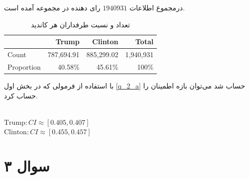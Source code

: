 \documentclass[12pt]{article}
\begin{document}
 درمجموع اطلاعات 
 $1940931$
 رای دهنده در مجموعه آمده است.
 



 \begin{table}[ht]
 	\centering
 	\caption{تعداد و نسبت طرفداران هر کاندید}
 	 \begin{latin}
 	\begin{tabular}{|l|r|r|r|}
 		\hline
 		& Trump & Clinton & Total \\
 		\hline
 		Count & 787,694.91 & 885,299.02 & 1,940,931 \\
 		Proportion & 40.58\% & 45.61\% & 100\% \\
 		\hline
 	\end{tabular}
 	  \end{latin}
 \end{table}

 با استفاده از فرمولی که در بخش اول  \ref{q_2_a} حساب شد می‌توان بازه اطمینان را حساب کرد.
 
\begin{latin}
	~\\
 $
\text{Trump}: CI \approx [0.405, 0.407]
 $
 \\
 $
 \text{Clinton}: CI \approx [0.455, 0.457]
 $
\end{latin}
\section{سوال ۳}
\end{document}
